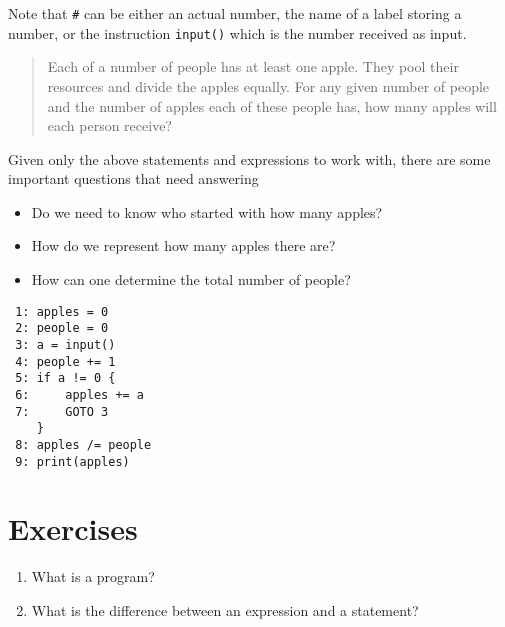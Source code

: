 Note that \texttt{\#} can be either an actual number, the name of a   label storing a number, or the instruction \texttt{input()} which is the   number received as input.
\begin{quotation}     Each of a number of people has at least one apple. They pool their    resources and divide the apples equally. For any given number of    people and the number of apples each of these people has, how many    apples will each person receive?    
\end{quotation}

Given only the above statements and expressions to work with, there   are some important questions that need answering
\begin{itemize}
	\item Do we need to know who started with how many apples?
	\item How do we represent how many apples there are?
	\item How can one determine the total number of people?
\end{itemize}
\begin{lstlisting}
 1: apples = 0
 2: people = 0
 3: a = input()
 4: people += 1
 5: if a != 0 {
 6:     apples += a
 7:     GOTO 3
    }
 8: apples /= people
 9: print(apples)
\end{lstlisting}

\section{Exercises}
\begin{enumerate}
	\item What is a program?
	\item What is the difference between an expression and a    statement?
\end{enumerate}
